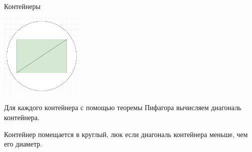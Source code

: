 \begin{tutorial}{Контейнеры}

\begin{center}
\includegraphics[width=4cm]{1.png}
\end{center}

Для каждого контейнера с помощью теоремы Пифагора вычисляем диагональ контейнера.

Контейнер помещается в круглый, люк если диагональ контейнера меньше, чем его диаметр.

\end{tutorial}
